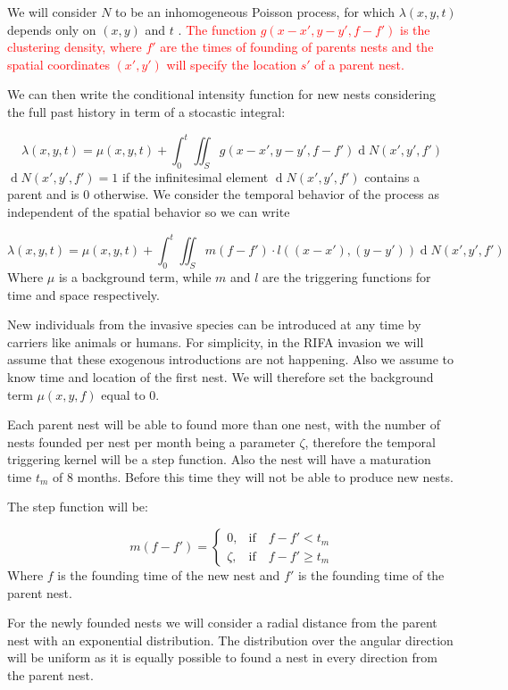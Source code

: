 \documentclass[11pt,a4paper]{article}
\renewcommand{\d}[1]{\ensuremath{\operatorname{d}\!{#1}}}
\begin{document}
We will consider $N$ to be an inhomogeneous Poisson process, for which $\lambda(x, y, t)$ depends only on $(x, y)$ and $t$ \cite{Shoenberg}. \textcolor{red}{The function $g(x - x', y - y', f - f')$ is the clustering density, where $f'$ are the times of founding of parents nests and the spatial coordinates $(x', y')$ will specify the location $s'$ of a parent nest.}


We can then write the conditional intensity function for new nests considering the full past history in term of a stocastic integral:

\[
\lambda(x, y, t) = \mu(x, y, t) + \int_{0}^{t} \iint_{S} g(x - x', y - y', f - f') \d N(x', y', f')
\]
$\d N(x', y', f') = 1$ if the infinitesimal element $\d N(x', y', f')$ contains a parent and is 0 otherwise. We consider the temporal behavior of the process as independent of the spatial behavior so we can write

\[
\lambda(x, y, t) = \mu(x, y, t) + \int_{0}^{t} \iint_{S} m(f-f') \cdot l((x - x'), (y - y')) \d N(x', y', f')
\]
Where $\mu$ is a background term, while $m$ and $l$ are the triggering functions for time and space respectively. 

New individuals from the invasive species can be introduced at any time by carriers like animals or humans. For simplicity, in the RIFA invasion we will assume that these exogenous introductions are not happening. Also we assume to know time and location of the first nest.  We will therefore set the background term $\mu(x, y, f) $ equal to 0.

Each parent nest will be able to found more than one nest, with the number of nests founded per nest per month being a parameter $\zeta$, therefore the temporal triggering kernel will be a step function. Also the nest will have a maturation time $t_m$ of 8 months. Before this time they will not be able to produce new nests. 

The step function will be:


\[
m (f - f') =
\begin{cases}
0, & \mbox{if} \quad f - f' < t_{m} \\
\zeta, & \mbox{if} \quad f - f' \geq t_{m}
\end{cases}
\]
Where $f$ is the founding time of the new nest and $f'$ is the founding time of the parent nest.

For the newly founded nests we will consider a radial distance from the parent nest with an exponential distribution. The distribution over the angular direction will be uniform as it is equally possible to found a nest in every direction from the parent nest.
\end{document}
